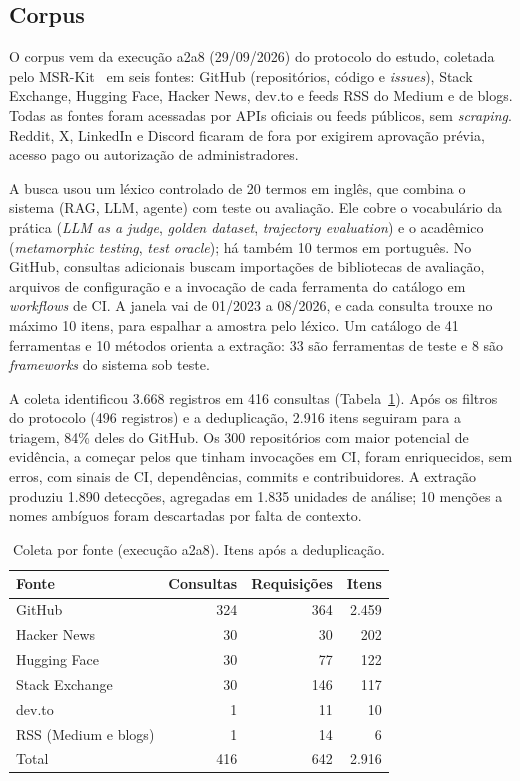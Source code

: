 \documentclass[sigconf]{acmart}
\begin{document}
\subsection{Corpus}

O corpus vem da execução a2a8 (29/09/2026) do protocolo do estudo, coletada pelo MSR-Kit~\cite{msrkit2027,msrkit} em seis fontes: GitHub (repositórios, código e \textit{issues}), Stack Exchange, Hugging Face, Hacker News, dev.to e feeds RSS do Medium e de blogs. Todas as fontes foram acessadas por APIs oficiais ou feeds públicos, sem \textit{scraping}. Reddit, X, LinkedIn e Discord ficaram de fora por exigirem aprovação prévia, acesso pago ou autorização de administradores.

A busca usou um léxico controlado de 20 termos em inglês, que combina o sistema (RAG, LLM, agente) com teste ou avaliação. Ele cobre o vocabulário da prática (\textit{LLM as a judge}, \textit{golden dataset}, \textit{trajectory evaluation}) e o acadêmico (\textit{metamorphic testing}, \textit{test oracle}); há também 10 termos em português. No GitHub, consultas adicionais buscam importações de bibliotecas de avaliação, arquivos de configuração e a invocação de cada ferramenta do catálogo em \textit{workflows} de CI. A janela vai de 01/2023 a 08/2026, e cada consulta trouxe no máximo 10 itens, para espalhar a amostra pelo léxico. Um catálogo de 41 ferramentas e 10 métodos orienta a extração: 33 são ferramentas de teste e 8 são \textit{frameworks} do sistema sob teste.

A coleta identificou 3.668 registros em 416 consultas (Tabela~\ref{tab:coleta}). Após os filtros do protocolo (496 registros) e a deduplicação, 2.916 itens seguiram para a triagem, 84\% deles do GitHub. Os 300 repositórios com maior potencial de evidência, a começar pelos que tinham invocações em CI, foram enriquecidos, sem erros, com sinais de CI, dependências, commits e contribuidores. A extração produziu 1.890 detecções, agregadas em 1.835 unidades de análise; 10 menções a nomes ambíguos foram descartadas por falta de contexto.

\begin{table}[t]
  \caption{Coleta por fonte (execução a2a8). Itens após a deduplicação.}
  \label{tab:coleta}
  \small
  \begin{tabular}{lrrr}
    \toprule
    Fonte & Consultas & Requisições & Itens \\
    \midrule
    GitHub & 324 & 364 & 2.459 \\
    Hacker News & 30 & 30 & 202 \\
    Hugging Face & 30 & 77 & 122 \\
    Stack Exchange & 30 & 146 & 117 \\
    dev.to & 1 & 11 & 10 \\
    RSS (Medium e blogs) & 1 & 14 & 6 \\
    \midrule
    Total & 416 & 642 & 2.916 \\
    \bottomrule
  \end{tabular}
\end{table}
\end{document}
